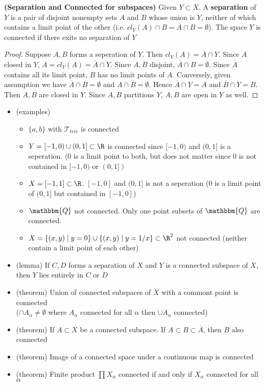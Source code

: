 \documentclass[10.5pt]{article}
\newcommand{\calT}{\mathcal{T}}
\newcommand{\Q}{\mathbbm{Q}}
\begin{document}
\begin{defn*}
    \textbf{(Separation and Connected for subspaces)} Given $Y\subset X$. A \textbf{separation} of $Y$ is a pair of disjoint nonempty sets $A$ and $B$ whose union is $Y$, neither of which contains a limit point of the other (i.e. $cl_Y(A) \cap B = \overline{A} \cap B = \emptyset$). The space $Y$ is connected if there exits no separation of $Y$
    \begin{proof}
        Suppose $A,B$ forms a seperation of $Y$. Then $cl_Y(A) = \overline{A}\cap Y$. Since $A$ closed in $Y$, $A=cl_Y(A) = \overline{A}\cap Y$. Since $A,B$ disjoint, $\overline{A} \cap B = \emptyset$. Since $\overline{A}$ contains all its limit point, $B$ has no limit points of $A$. Conversely, given assumption we have $\overline{A} \cap B = \emptyset$ and $A\cap \overline{B} = \emptyset$. Hence $\overline{A} \cap Y = A$ and $\overline{B} \cap Y = B$. Then $A,B$ are closed in $Y$. Since $A,B$ partitions $Y$, $A,B$ are open in $Y$ as well.
    \end{proof}
    \begin{itemize}
        \item (examples)
        \begin{itemize}
            \item $\{a,b\}$ with $\calT_{triv}$ is connected
            \item $Y=[-1,0)\cup (0,1] \subset \R$ is connected since $[-1,0)$ and $(0,1]$ is a seperation. ($0$ is a limit point to both, but does not matter since $0$ is not contained in $[-1,0)$ or $(0,1])$
            \item $X=[-1,1]\subset\R$. $[-1,0]$ and $(0,1]$ is not a seperation ($0$ is a limit point of $(0,1]$ but contained in $[-1,0]$)
            \item $\Q$ not connected. Only one point subsets of $\Q$ are connected.
            \item $X = \{(x,y) \mid y=0\} \cup \{(x,y) \mid y = 1/x \} \subset \R^2$ not connected (neither contain a limit point of each other)
        \end{itemize}
        \item (lemma) If $C,D$ forms a separation of $X$ and $Y$ is a connected subspace of $X$, then $Y$ lies entirely in $C$ or $D$
        \item (theorem) Union of connected subspaces of $X$ with a commont point is connected  \\ 
        ($\textstyle \cap A_{\alpha} \neq \emptyset$ where $A_{\alpha}$ connected for all $\alpha$ then $\textstyle \cup A_{\alpha}$ connected)
        \item (theorem) If $A\subset X$ be a connected subspace. If $A\subset B \subset \overline{A}$, then $B$ also connected
        \item (theorem) Image of a connected space under a continuous map is connected
        \item (theorem) Finite product $\textstyle \prod X_{\alpha}$ connected if and only if $X_{\alpha}$ connected for all $\alpha$
    \end{itemize}
\end{defn*}
\end{document}
